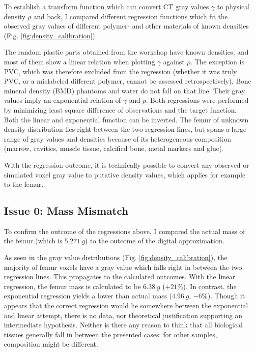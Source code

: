To establish a transform function which can convert CT gray values \(\gamma\) to physical density \(\rho\) and back, I compared different regression functions which fit the observed gray values of different polymer- and other materials of known densities (Fig. \ref{fig:density_calibration}).

The random plastic parts obtained from the workshop have known densities, and most of them show a linear relation when plotting \(\gamma\) against \(\rho\).
The exception is PVC, which was therefore excluded from the regression (whether it was truly PVC, or a mislabeled different polymer, cannot be assessed retrospectively).
Bone mineral density (BMD) phantoms and water do not fall on that line.
Their gray values imply an exponential relation of \(\gamma\) and \(\rho\).
Both regressions were performed by minimizing least square difference of observations and the target function.
Both the linear and exponential function can be inverted.
The femur of unknown density distribution lies right between the two regression lines, but spans a large range of gray values and densities because of its heterogeneous composition (marrow, cavities, muscle tissue, calcified bone, metal markers and glue).

With the regression outcome, it is technically possible to convert any observed or simulated voxel gray value to putative density values, which applies for example to the femur.


\subsection{Issue 0: Mass Mismatch}
\label{sec:org1b91184}

To confirm the outcome of the regressions above, I compared the actual mass of the femur (which is \(5.271\ g\)) to the outcome of the digital approximation.

As seen in the gray value distributions (Fig. \ref{fig:density_calibration}), the majority of femur voxels have a gray value which falls right in between the two regression lines.
This propagates to the calculated outcomes.
With the linear regression, the femur mass is calculated to be \(6.38\ g\) (\(+21 \%\)).
In contrast, the exponential regression yields a lower than actual mass (\(4.96\ g\), \(-6 \%\)).
Though it appears that the correct regression would lie somewhere between the exponential and linear attempt, there is no data, nor theoretical justification supporting an intermediate hypothesis.
Neither is there any reason to think that all biological tissues generally fall in between the presented cases: for other samples, composition might be different.

